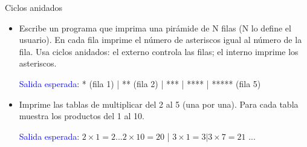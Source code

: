 \documentclass{beamer}
\begin{document}
    \begin{frame}[fragile, t]{Ciclos anidados}
        \begin{itemize}
            \item Escribe un programa que imprima una pirámide de N filas (N lo define el usuario). En cada fila imprime el número de asteriscos igual al número de la fila. Usa ciclos anidados: el externo controla las filas; el interno imprime los asteriscos.
            
            \textcolor{blue}{Salida esperada}: *        (fila 1)  |  **  (fila 2)  |  ***  |  ****  |  *****  (fila 5)
            \item Imprime las tablas de multiplicar del 2 al 5 (una por una). Para cada tabla muestra los productos del 1 al 10.
            
            \textcolor{blue}{Salida esperada}: $2 \times 1 = 2  ...  2 \times 10 = 20$  | $3 \times 1 = 3  |  3 \times 7 = 21$ ... 
        \end{itemize}
    \end{frame}
\end{document}

